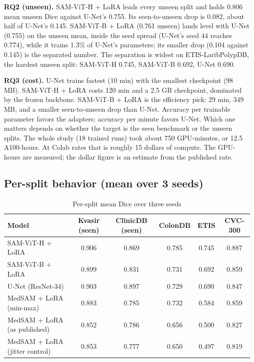\documentclass[conference]{IEEEtran}
\begin{document}
\textbf{RQ2 (unseen).} SAM-ViT-H + LoRA leads every unseen split and holds 0.806 mean unseen Dice against U-Net's 0.755. Its seen-to-unseen drop is 0.082, about half of U-Net's 0.145. SAM-ViT-B + LoRA (0.761 unseen) lands level with U-Net (0.755) on the unseen mean, inside the seed spread (U-Net's seed 44 reaches 0.774), while it trains 1.3\% of U-Net's parameters; its smaller drop (0.104 against 0.145) is the separated number. The separation is widest on ETIS-LaribPolypDB, the hardest unseen split: SAM-ViT-H 0.745, SAM-ViT-B 0.692, U-Net 0.690.

\textbf{RQ3 (cost).} U-Net trains fastest (10 min) with the smallest checkpoint (98 MB). SAM-ViT-H + LoRA costs 120 min and a 2.5 GB checkpoint, dominated by the frozen backbone. SAM-ViT-B + LoRA is the efficiency pick: 29 min, 349 MB, and a smaller seen-to-unseen drop than U-Net. Accuracy per trainable parameter favors the adapters; accuracy per minute favors U-Net. Which one matters depends on whether the target is the seen benchmark or the unseen splits. The whole study (18 trained runs) took about 750 GPU-minutes, or 12.5 A100-hours. At Colab rates that is roughly 15 dollars of compute. The GPU-hours are measured; the dollar figure is an estimate from the published rate.


\subsection{Per-split behavior (mean over 3 seeds)}\label{sec:6.2}
\begin{table}[t]
\centering
\footnotesize
\caption{Per-split mean Dice over three seeds}
\label{tab:5}
\begin{tabular}{lccccc}
\hline
\textbf{Model} & \textbf{Kvasir (seen)} & \textbf{ClinicDB (seen)} & \textbf{ColonDB} & \textbf{ETIS} & \textbf{CVC-300} \\
\hline
SAM-ViT-H + LoRA & 0.906 & 0.869 & 0.785 & 0.745 & 0.887 \\
SAM-ViT-B + LoRA & 0.899 & 0.831 & 0.731 & 0.692 & 0.859 \\
U-Net (ResNet-34) & 0.903 & 0.897 & 0.729 & 0.690 & 0.847 \\
MedSAM + LoRA (min-max) & 0.883 & 0.785 & 0.732 & 0.584 & 0.859 \\
MedSAM + LoRA (as published) & 0.852 & 0.786 & 0.656 & 0.500 & 0.827 \\
MedSAM + LoRA (jitter control) & 0.853 & 0.777 & 0.650 & 0.497 & 0.819 \\
\hline
\end{tabular}
\end{table}
\end{document}
